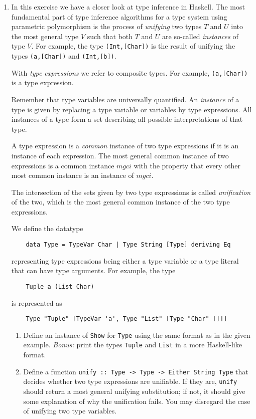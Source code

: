 \documentclass{article}
\def\code#1{\texttt{#1}}
\begin{document}
\begin{enumerate}
    \item \cite[p. 314]{thompson} In this exercise we have a closer look at type inference in Haskell. The most fundamental part of type inference algorithms for a type system using parametric polymorphism is the process of \textit{unifying} two types $T$ and $U$ into the most general type $V$ such that both $T$ and $U$ are so-called \textit{instances} of type $V$. For example, the type \code{(Int,[Char])} is the result of unifying the types \code{(a,[Char])} and \code{(Int,[b])}. \par
        With \textit{type expressions} we refer to composite types. For example, \code{(a,[Char])} is a type expression. \par
        Remember that type variables are universally quantified. An \textit{instance} of a type is given by replacing a type variable or variables by type expressions. All instances of a type form a set describing all possible interpretations of that type. \par
        A type expression is a \textit{common} instance of two type expressions if it is an instance of each expression. The most general common instance of two expressions is a common instance $mgci$ with the property that every other most common instance is an instance of $mgci$. \par
        The intersection of the sets given by two type expressions is called \textit{unification} of the two, which is the most general common instance of the two type expressions. \par
        We define the datatype
        \begin{verbatim}
    data Type = TypeVar Char | Type String [Type] deriving Eq
        \end{verbatim}
        representing type expressions being either a type variable or a type literal that can have type arguments. For example, the type
        \begin{verbatim}
    Tuple a (List Char)
        \end{verbatim}
        is represented as
        \begin{verbatim}
    Type "Tuple" [TypeVar 'a', Type "List" [Type "Char" []]]
        \end{verbatim}
        \begin{enumerate}
            \item Define an instance of \code{Show} for \code{Type} using the same format as in the given example. \textit{Bonus:} print the types \code{Tuple} and \code{List} in a more Haskell-like format.
            \item Define a function \code{unify :: Type -> Type -> Either String Type} that decides whether two type expressions are unifiable. If they are, \code{unify} should return a most general unifying substitution; if not, it should give some explanation of why the unification fails. You may disregard the case of unifying two type variables.
        \end{enumerate}
\end{enumerate}
\end{document}
